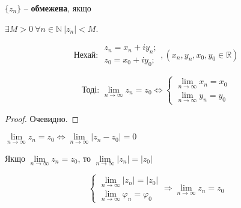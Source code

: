 $\{z_n\}$ -- \textbf{обмежена}, якщо 

$\exists M>0 ~ \forall n \in \mathbb{N} ~ |z_n|<M$.

\begin{theorem}
$$
\text{Нехай: } \begin{array}{l}
z_n=x_n+iy_n; \\
z_0=x_0+iy_0;
\end{array}, 
(x_n,y_n,x_0,y_0 \in \mathbb{R})
$$

$$
\text{Тоді: }\lim\limits_{n\rightarrow\infty} z_n = z_0 \Leftrightarrow 
\left\{ \begin{array}{l}
\lim\limits_{n\rightarrow\infty} x_n = x_0 \\
\lim\limits_{n\rightarrow\infty} y_n = y_0
\end{array}\right.
$$
\end{theorem}
\begin{proof}
Очевидно.
\end{proof}

\begin{claim}
$\lim\limits_{n\rightarrow\infty} z_n = z_0 \Leftrightarrow \lim\limits_{n\rightarrow\infty} |z_n-z_0| = 0$
\end{claim}

\begin{theorem}
Якщо $\lim\limits_{n\rightarrow\infty} z_n = z_0$, то $\lim\limits_{n\rightarrow\infty} |z_n| = |z_0|$
\end{theorem}

\begin{theorem}
$$ 
\left\{ \begin{array}{l}
\lim\limits_{n\rightarrow\infty} |z_n| = |z_0| \\
\lim\limits_{n\rightarrow\infty} \varphi_n = \varphi_0
\end{array}\right.
\Rightarrow \lim\limits_{n\rightarrow\infty} z_n = z_0
$$
\end{theorem}
